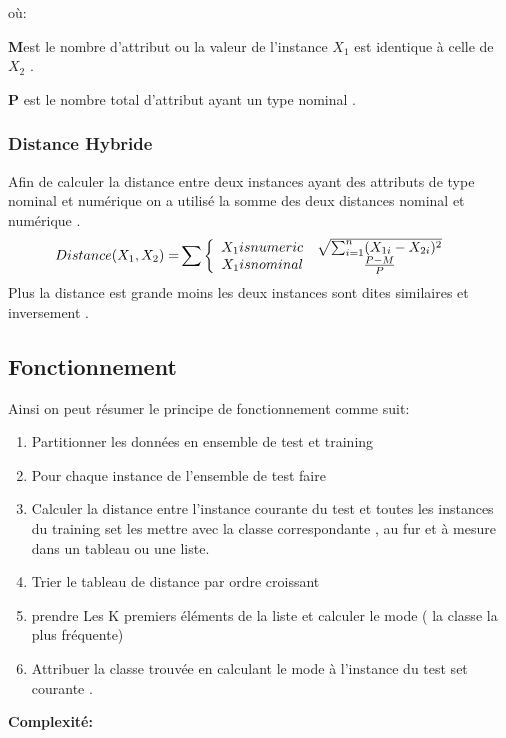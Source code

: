 \documentclass[12pt,a4paper,oneside]{book}
\begin{document}
	où:
	
	\textbf{M}est le nombre d'attribut ou la valeur de l'instance $X_{1}$ est identique à celle de $X_{2}$ .
	
	\textbf{P} est le nombre total d'attribut ayant un type nominal .
	
	
	\subsubsection{Distance Hybride}
	Afin de calculer la distance entre deux instances ayant des attributs de type nominal et numérique on a utilisé la somme des deux distances nominal et numérique .
	\begin{equation*}
	\begin{split}
	Distance(X_{1},X_{2}) =& \sum \left \{ 
	\begin{array}{r c}
	X_{1} is numeric &  \sqrt{ \sum_{i=1}^{n} (X_{1i} - X_{2i})^2}\\
	X_{1} is nominal & \frac{P-M}{P}
	\end{array}
	\right .
	\end{split}
	\end{equation*}
	Plus la distance est grande moins les deux instances sont dites similaires et inversement .
	
	\subsection{Fonctionnement}
	
	Ainsi on peut résumer le principe  de fonctionnement comme suit:
	\begin{enumerate}
		\item Partitionner les données en ensemble de test et training
		\item Pour chaque instance de l'ensemble de test faire 
		\item Calculer la distance entre l'instance courante du test et toutes les instances du training set les mettre avec la classe correspondante , au fur et à mesure dans un tableau ou une liste.
		\item Trier le tableau de distance par ordre croissant 
		\item prendre Les K premiers éléments de la liste  et calculer le mode ( la classe la plus fréquente)
		\item Attribuer la classe trouvée en calculant le mode à l'instance du test set courante .
	\end{enumerate}
		\textbf{Complexité:}\\
		
\end{document}
